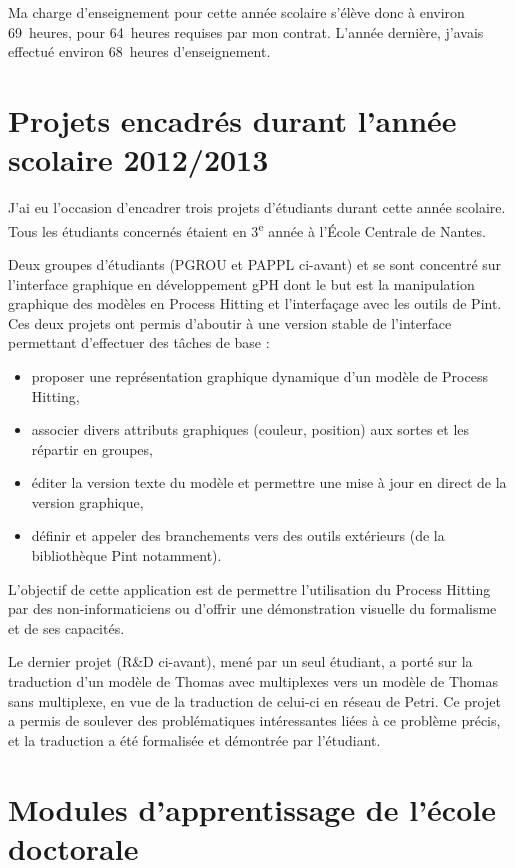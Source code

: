 Ma charge d'enseignement pour cette année scolaire s'élève donc à environ 69~heures, pour 64~heures requises par mon contrat.
L'année dernière, j'avais effectué environ 68~heures d'enseignement.



\section{Projets encadrés durant l'année scolaire 2012/2013}

J'ai eu l'occasion d'encadrer trois projets d'étudiants durant cette année scolaire. Tous les étudiants concernés étaient en 3\textsuperscript{e} année à l'École Centrale de Nantes.

Deux groupes d'étudiants (PGROU et PAPPL ci-avant) et se sont concentré sur l'interface graphique en développement gPH dont le but est la manipulation graphique des modèles en Process Hitting et l'interfaçage avec les outils de Pint.
Ces deux projets ont permis d'aboutir à une version stable de l'interface permettant d'effectuer des tâches de base :
\begin{itemize}
  \item proposer une représentation graphique dynamique d'un modèle de Process Hitting,
  \item associer divers attributs graphiques (couleur, position) aux sortes et les répartir en groupes,
  \item éditer la version texte du modèle et permettre une mise à jour en direct de la version graphique,
  \item définir et appeler des branchements vers des outils extérieurs (de la bibliothèque Pint notamment).
\end{itemize}
L'objectif de cette application est de permettre l'utilisation du Process Hitting par des non-informaticiens ou d'offrir une démonstration visuelle du formalisme et de ses capacités.

Le dernier projet (R\&D ci-avant), mené par un seul étudiant, a porté sur la traduction d'un modèle de Thomas avec multiplexes vers un modèle de Thomas sans multiplexe, en vue de la traduction de celui-ci en réseau de Petri.
Ce projet a permis de soulever des problématiques intéressantes liées à ce problème précis, et la traduction a été formalisée et démontrée par l'étudiant.



\section{Modules d'apprentissage de l'école doctorale}

